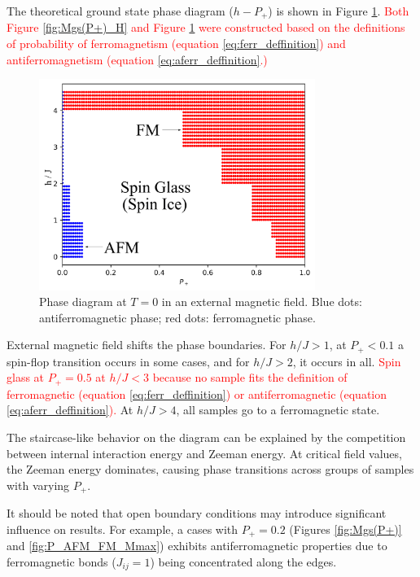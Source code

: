 \documentclass[preprint,12pt]{elsarticle}
\begin{document}
	The theoretical ground state phase diagram ($h-P_+$) is shown in Figure \ref{fig:P+_afm_fm(H)}. \textcolor{red}{Both Figure \ref{fig:Mgs(P+)_H} and Figure \ref{fig:P+_afm_fm(H)} were constructed based on the definitions of probability of ferromagnetism (equation \eqref{eq:ferr_deffinition}) and antiferromagnetism (equation \eqref{eq:aferr_deffinition}.)}
	
	\begin{figure}[H]
		\centering
		\includegraphics[width=0.8\textwidth]{images/P+_afm_fm(H)_filled.png}
		\caption{Phase diagram at $T = 0$ in an external magnetic field. Blue dots: antiferromagnetic phase; red dots: ferromagnetic phase.}
		\label{fig:P+_afm_fm(H)}
	\end{figure}
	
	External magnetic field shifts the phase boundaries. For $h/J > 1$, at $P_+ < 0.1$ a spin-flop transition occurs in some cases, and for $h/J > 2$, it occurs in all. \textcolor{red}{Spin glass at $P_+ = 0.5$ at $h/J < 3$ because no sample fits the definition of ferromagnetic (equation \eqref{eq:ferr_deffinition}) or antiferromagnetic (equation \eqref{eq:aferr_deffinition}).} At $h/J > 4$, all samples go to a ferromagnetic state. 
	
	The staircase-like behavior on the diagram can be explained by the competition between internal interaction energy and Zeeman energy. At critical field values, the Zeeman energy dominates, causing phase transitions across groups of samples with varying $P_+$.
	
	It should be noted that open boundary conditions may introduce significant influence on results. For example, a cases with $P_+ = 0.2$ (Figures \ref{fig:Mgs(P+)} and \ref{fig:P_AFM_FM_Mmax}) exhibits antiferromagnetic properties due to ferromagnetic bonds ($J_{ij} = 1$) being concentrated along the edges.
	
\end{document}
